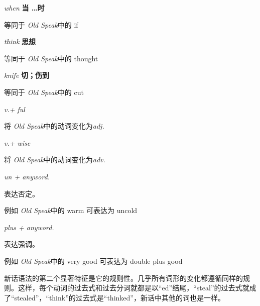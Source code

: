 \documentclass[lang=cn, color=black]{elegantbook}
\newenvironment{word}[2]{
    \noindent \textit{#1} \quad \textbf{#2} \\
    \indent
}{}
\newcommand{\os}{\textit{Old Speak}}
\newcommand{\eos}[1]{等同于 \os 中的 #1}
\newcommand{\vocab}{\textit{v.}}
\newcommand{\adj}{\textit{adj.}}
\newcommand{\adv}{\textit{adv.}}
\newcommand{\anyword}{\textit{anyword.}}
\begin{document}
                \begin{multicols}{2}
                    \begin{word}{when}{当 \dots 时}
                        \eos{if}
                    \end{word}
    
                    \begin{word}{think}{思想}
                        \eos{thought}
                    \end{word}
    
                    \begin{word}{knife}{切；伤到}
                        \eos{cut}
                    \end{word}
    
                    \begin{word}{\vocab + ful}{}
                        将 \os 中的动词变化为\adj
                    \end{word}

                    \begin{word}{\vocab + wise}{}
                        将 \os 中的动词变化为\adv
                    \end{word}

                    \begin{word}{un + \anyword}{}
                        表达否定。
                        
                        例如 \os 中的 warm 可表达为 uncold
                    \end{word}

                    \begin{word}{plus + \anyword}{}
                        表达强调。
                        
                        例如 \os 中的 very good 可表达为 double plus good
                    \end{word}
                \end{multicols}

                新话语法的第二个显著特征是它的规则性。几乎所有词形的变化都遵循同样的规则。这样，每个动词的过去式和过去分词就都是以“ed”结尾，“steal”的过去式就成了“stealed”，“think”的过去式是“thinked”，新话中其他的词也是一样。
\end{document}
